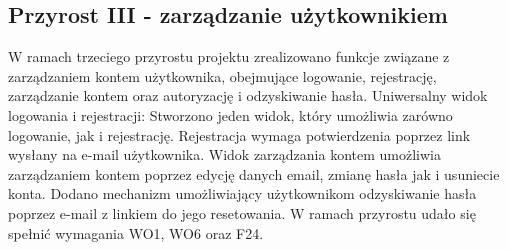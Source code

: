     \subsection{Przyrost III - zarządzanie użytkownikiem}
    \label{sec:przyrost3}
    W ramach trzeciego przyrostu projektu zrealizowano funkcje związane z zarządzaniem kontem użytkownika, obejmujące logowanie, rejestrację, zarządzanie kontem oraz autoryzację i odzyskiwanie hasła. \newline
    \indent Uniwersalny widok logowania i rejestracji: Stworzono jeden widok, który umożliwia zarówno logowanie, jak i rejestrację. Rejestracja wymaga potwierdzenia poprzez link wysłany na e-mail użytkownika. \newline
    \indent Widok zarządzania kontem umożliwia zarządzaniem kontem poprzez edycję danych email, zmianę hasła jak i usuniecie konta. \newline 
    \indent Dodano mechanizm umożliwiający użytkownikom odzyskiwanie hasła poprzez e-mail z linkiem do jego resetowania.
    W ramach przyrostu udało się spełnić wymagania WO1, WO6 oraz F24.





